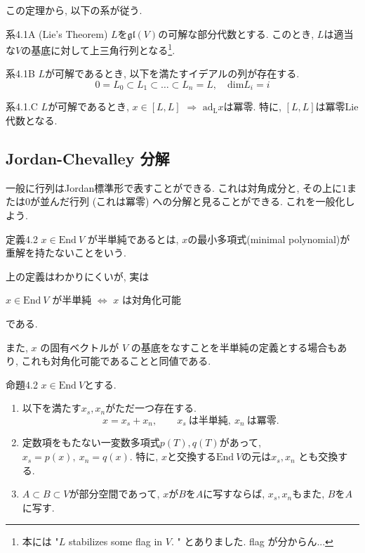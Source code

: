 \documentclass[a4paper,12pt]{ltjsarticle}
\begin{document}
この定理から, 以下の系が従う. 

\begin{thm}{系4.1A (Lie's Theorem)}
  $L$を$\mathfrak{gl}(V)$の可解な部分代数とする. このとき, $L$は適当な$V$の基底に対して上三角行列となる\footnote{本には "$L$ stabilizes some flag in $V$. " とありました. flag が分からん...}. 
\end{thm}

\begin{thm}{系4.1B}
  $L$が可解であるとき, 以下を満たすイデアルの列が存在する. 
  \begin{equation}
    0 = L_0 \subset L_1 \subset \ldots \subset L_n = L, \quad \mathrm{dim}L_i = i
  \end{equation}
\end{thm}

\begin{thm}{系4.1.C}
  $L$が可解であるとき, $x \in [L, L]$ $\Rightarrow$ $\mathrm{ad_L} x$は冪零. 特に, $[L, L]$は冪零Lie代数となる. 
\end{thm}

\subsection{Jordan-Chevalley 分解}
一般に行列はJordan標準形で表すことができる. これは対角成分と, その上に$1$または$0$が並んだ行列 (これは冪零) への分解と見ることができる. これを一般化しよう. 

\begin{defi}{定義4.2}
  $x \in \mathrm{End}~ V$ が半単純であるとは, $x$の最小多項式(minimal polynomial)が重解を持たないことをいう. 
\end{defi}

\begin{marker}
  上の定義はわかりにくいが, 実は
  \begin{center}
    $x \in \mathrm{End}~ V$ が半単純 $\Leftrightarrow$ $x$ は対角化可能
  \end{center}
  である. 
  
  また, $x$ の固有ベクトルが $V$ の基底をなすことを半単純の定義とする場合もあり\cite{hantanjun}, これも対角化可能であることと同値である. 
\end{marker}

\renewcommand{\labelenumi}{(\alph{enumi})}

\begin{thm}{命題4.2}
  $x \in \mathrm{End}~V$とする. 
  \begin{enumerate}
    \item 以下を満たす$x_s, x_n$がただ一つ存在する. 
    \begin{equation}
      x = x_s + x_n, \qquad x_s~は半単純,~x_n~は冪零.
    \end{equation}
    \item 定数項をもたない一変数多項式$p(T), q(T)$があって, $x_s = p(x),~ x_n = q(x)$. 特に, $x$と交換する$\mathrm{End}~V$の元は$x_s, x_n$ とも交換する. 
    \item $A \subset B \subset V$が部分空間であって, $x$が$B$を$A$に写すならば, $x_s, x_n$もまた, $B$を$A$に写す. 
  \end{enumerate}
\end{thm}
\end{document}
